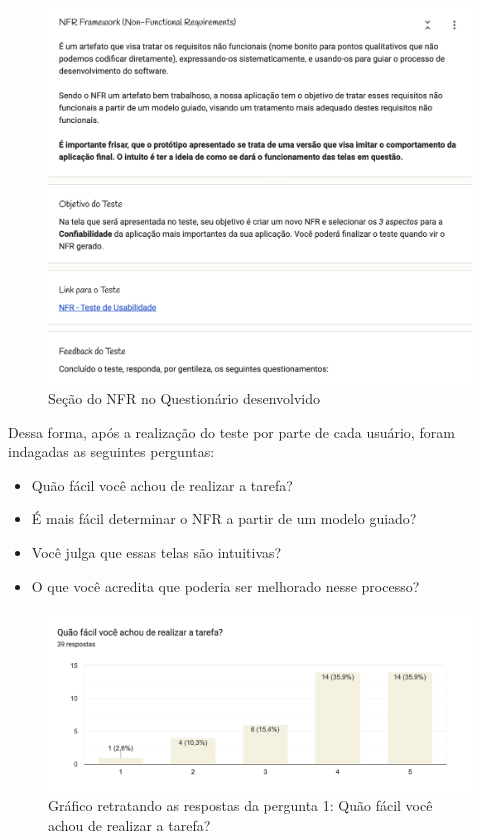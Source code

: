 \begin{figure}[]
    \begin{center}
        \caption{{Seção do NFR no Questionário desenvolvido}}
        \label{fig:nfr_secao}
        \includegraphics[scale=0.5]{figuras/questionario/nfr-section-1.png}
    \end{center}
\end{figure}

Dessa forma, após a realização do teste por parte de cada usuário, foram indagadas as seguintes perguntas:

\begin{itemize}
    \item Quão fácil você achou de realizar a tarefa?
    \item É mais fácil determinar o NFR a partir de um modelo guiado?
    \item Você julga que essas telas são intuitivas?
    \item O que você acredita que poderia ser melhorado nesse processo?
\end{itemize}

\begin{figure}[H]
    \begin{center}
        \caption{{Gráfico retratando as respostas da pergunta 1: Quão fácil você achou de realizar a tarefa?}}
        \label{fig:nfr_respostas_1}
        \includegraphics[scale=0.65]{figuras/questionario/nfr-1.png}
    \end{center}
\end{figure}

